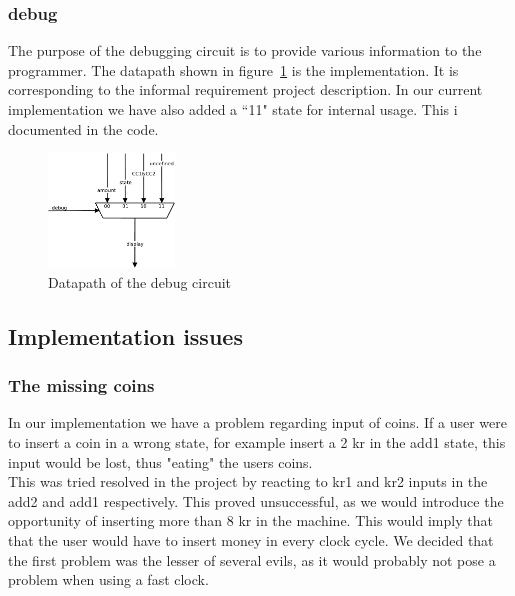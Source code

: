 \subsubsection{debug}
The purpose of the debugging circuit is to provide various information to the programmer. The datapath shown in figure~\ref{fig:debug} is the implementation. It is corresponding to the informal requirement project description. In our current implementation we have also added a ``11" state for internal usage. This i documented in the code.
\begin{figure}
\centering
\includegraphics[width=0.3\textwidth]{fig/datapath_debug.pdf}
\caption{Datapath of the debug circuit}
\label{fig:debug}
\end{figure}

\subsection{Implementation issues}
\label{sec:implementation_issues}
\subsubsection{The missing coins}
\label{sec:missing_coins}
In our implementation we have a problem regarding input of coins. If a user were to insert a coin in a wrong state, for example insert a 2 kr in the add1 state, this input would be lost, thus "eating" the users coins.\\
This was tried resolved in the project by reacting to kr1 and kr2 inputs in the add2 and add1 respectively. This proved unsuccessful, as we would introduce the opportunity of inserting more than 8 kr in the machine. This would imply that that the user would have to insert money in every clock cycle. We decided that the first problem was the lesser of several evils, as it would probably not pose a problem when using a fast clock.